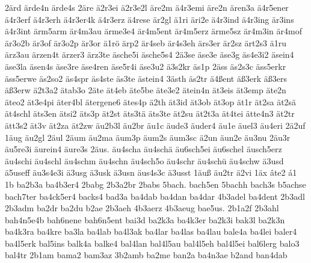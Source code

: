 {    2ärd
    ärde4n
    ärde4s
    2äre
    ä2r3ei
    ä2r3e2l
    äre2m
    ä4r3emi
    äre2n
    ären3a
    ä4r5ener
    ä4r3erf
    ä4r3erh
    ä4r3er4k
    ä4r3erz
    ä4rese
    är2gl
    ä1ri
    äri2e
    ä4r3ind
    ä4r3ing
    är3ins
    ä4r3int
    ärm5arm
    är4m3au
    ärme3e4
    är4m5ent
    är4m5erz
    ärme5sz
    är4m3in
    är4mof
    är3o2b
    är3of
    är3o2p
    är3or
    ä1rö
    ärp2
    är4seb
    är4s3eh
    ärs3er
    är2sz
    ärt2s3
    ä1ru
    ärz3au
    ärzen4t
    ärzer3
    ärz3te
    äsche5i
    äsche5s4
    2ä3se
    äse3e
    äse3g
    äs4e3i2
    äsein4
    äse3la
    äsen4s
    äse3re
    äse4ren
    äse5r4i
    äse3u2
    ä3s2kr
    äs1p
    2äss
    äs2s3c
    äss5erkr
    äss5erwe
    äs2so2
    äs4spr
    äs4ste
    äs3te
    ästein4
    3ästh
    äs2tr
    ä4ßent
    äß3erk
    äß3ers
    äß3erw
    ä2t3a2
    ätab3o
    2äte
    ät4eb
    äte5be
    äte3e2
    ätein4n
    ät3eis
    ät3emp
    äte2n
    äteo2
    ät3e4pi
    äter4bl
    ätergene6
    ätes4p
    ä2th
    ät3id
    ät3ob
    ät3op
    ät1r
    ät2sa
    ät2sä
    ät4schl
    äts3en
    ätsi2
    äts3p
    ät2st
    äts3tä
    äts3te
    ät2su
    ät2t3a
    ät4tei
    ätte4n3
    ät2tr
    ätt3s2
    ät3v
    ät2za
    ät2zw
    äu2b3l
    äu2br
    äu1c
    äude3
    äuder4
    äu1e
    äuel3
    äu4eri
    2ä2uf
    1äug
    äu2gl
    2äul
    2äum
    äu2ma
    äum3p
    äum2s
    äum3sc
    ä2un
    äun2e
    äu3nu
    2äu3r
    äu5re3i
    äurein4
    äure3s
    2äus.
    äu4scha
    äu4schä
    äu6sch5ei
    äu6schel
    äusch5erz
    äu4schi
    äu4schl
    äu4schm
    äu4schn
    äu4sch5o
    äu4schr
    äu4schü
    äu4schw
    ä3usd
    ä5useff
    äu3s4e3i
    ä3usg
    ä3usk
    ä3usn
    äus4s3c
    ä3usst
    1äuß
    äu2tr
    ä2vi
    1äx
    âte2
    á1
    1b
    ba2b3a
    ba4b3er4
    2babg
    2b3a2br
    2babs
    5bach.
    bach5en
    5bachh
    bach3s
    b5achse
    bach7ter
    ba4ck5er4
    backs4
    bad3a
    ba4dab
    ba4dan
    ba4dar
    4b3adel
    ba4dent
    2b3adl
    2b3adm
    ba2dr
    ba2du
    b2ae
    2b3aeh
    4b3aerz
    4b3aeug
    bae5us.
    2b1a2f
    2b3ahl
    bah4n5e4b
    bah6nene
    bah6n5ent
    bai3d
    ba2k3a
    ba4k3er
    ba2k3i
    bak3l
    ba2k3n
    ba4k3ra
    ba4kre
    ba3la
    ba4lab
    ba4l3ak
    ba4lar
    ba4las
    ba4lau
    bale4a
    ba4lei
    baler4
    ba4l5erk
    bal5ins
    balk4a
    balke4
    bal4lan
    bal4l5au
    bal4l5eh
    bal4l5ei
    bal6lerg
    balo3
    bal4tr
    2b1am
    bama2
    bam3az
    3b2amb
    ba2me
    ban2a
    ba4n3ae
    b2and
    ban4dab
}
